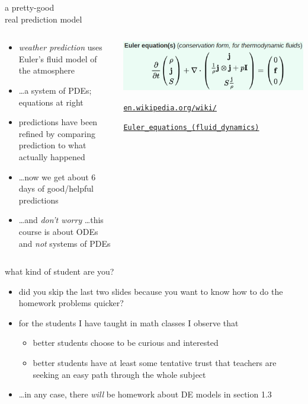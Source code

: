 \documentclass{beamer}
\begin{document}
\begin{frame}{a pretty-good \\ real prediction model}

\begin{columns}
\begin{column}{0.5\textwidth}
\begin{itemize}
\item \emph{weather prediction} uses Euler's fluid model of the atmosphere
\item \dots a system of PDEs; equations at right
\item predictions have been refined by comparing prediction to what actually happened
\item \dots now we get about 6 days of good/helpful predictions
\item \small \dots and \emph{don't worry} \dots this course is about ODEs and \emph{not} systems of PDEs
\end{itemize}
\end{column}
\begin{column}{0.5\textwidth}
\includegraphics[width=\textwidth]{figs/euler-equations}

\medskip

\quad \tiny \href{https://en.wikipedia.org/wiki/Euler_equations_(fluid_dynamics)}{\texttt{en.wikipedia.org/wiki/}}

\qquad \href{https://en.wikipedia.org/wiki/Euler_equations_(fluid_dynamics)}{\texttt{Euler\_equations\_(fluid\_dynamics)}}
\end{column}
\end{columns}
\end{frame}


\begin{frame}{what kind of student are you?}

\begin{itemize}
\item did you skip the last two slides because you want to know how to do the homework problems quicker?
\item for the students I have taught in math classes I observe that
    \begin{itemize}
    \item better students choose to be curious and interested
    \item better students have at least some tentative trust that teachers are seeking an easy path through the whole subject
    \end{itemize}

\bigskip
\item \dots in any case, there \emph{will} be homework about DE models in section 1.3
\end{itemize}
\end{frame}
\end{document}
